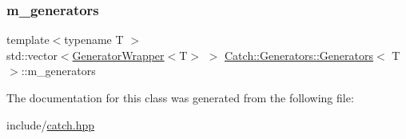 \subsubsection{\texorpdfstring{m\_generators}{m\_generators}}
{\footnotesize\ttfamily template$<$typename T $>$ \\
std\+::vector$<$\mbox{\hyperlink{class_catch_1_1_generators_1_1_generator_wrapper}{Generator\+Wrapper}}$<$T$>$ $>$ \mbox{\hyperlink{class_catch_1_1_generators_1_1_generators}{Catch\+::\+Generators\+::\+Generators}}$<$ T $>$\+::m\+\_\+generators\hspace{0.3cm}{\ttfamily [private]}}



The documentation for this class was generated from the following file\+:\begin{DoxyCompactItemize}
\item 
include/\mbox{\hyperlink{catch_8hpp}{catch.\+hpp}}\end{DoxyCompactItemize}
